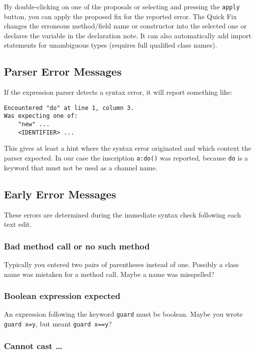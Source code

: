 By double-clicking on one of the proposals or selecting and pressing the \texttt{apply} button, you can apply the proposed fix for the reported error. The Quick Fix changes the erroneous method/field name or constructor into the selected one or declares the variable in the declaration note. It can also automatically add import statements for unambiguous types (requires full qualified class names).  

\subsection{Parser Error Messages}

If the expression parser detects a syntax error,
it will report something like:
\begin{lstlisting}[style=xnonfloating]
Encountered "do" at line 1, column 3.
Was expecting one of:
    "new" ...
    <IDENTIFIER> ...
\end{lstlisting}
This gives at least a hint where the syntax error
originated and which context the parser expected.
In our case the inscription \texttt{a:do()}
was reported, because \texttt{do} is a keyword that
must not be used as a channel name.


\subsection{Early Error Messages}

These errors are determined during the immediate
syntax check following each text edit.

\subsubsection{Bad method call or no such method}

Typically you entered two pairs of parentheses
instead of one. Possibly a class name was mistaken
for a method call. Maybe a name was misspelled?

\subsubsection{Boolean expression expected}

An expression following the keyword \texttt{guard}
must be boolean. Maybe you wrote \texttt{guard x=y}, but
meant \texttt{guard x==y}?

\subsubsection{Cannot cast \dots}

